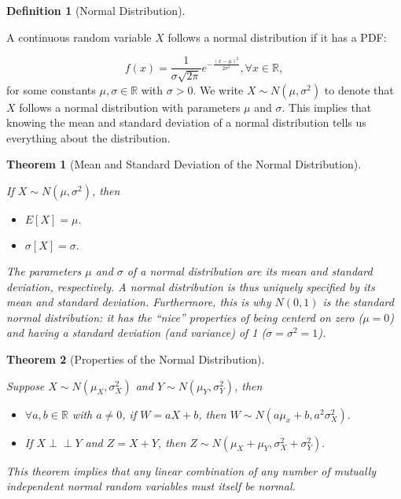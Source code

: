 \documentclass[
]{article}
\providecommand{\tightlist}{%
  \setlength{\itemsep}{0pt}\setlength{\parskip}{0pt}}
\newtheorem{theorem}{Theorem}[section]
\theoremstyle{definition}
\newtheorem{definition}{Definition}[section]
\theoremstyle{definition}
\theoremstyle{definition}
\theoremstyle{remark}
\begin{document}
\begin{definition}[Normal Distribution]
\protect\hypertarget{def:unlabeled-div-73}{}\label{def:unlabeled-div-73}

A continuous random variable \(X\) follows a normal distribution if it has a PDF:

\[f(x) = \frac{1}{\sigma\sqrt{2\pi}} e^{-\frac{(x - \mu)^2}{2\sigma^2}}, \forall x \in \mathbb{R},\]
for some constants \(\mu, \sigma \in \mathbb{R}\) with \(\sigma > 0\). We write \(X \sim N(\mu, \sigma^2)\) to denote that \(X\) follows a normal distribution with parameters \(\mu\) and \(\sigma\). This implies that knowing the mean and standard deviation of a normal distribution tells us everything about the distribution.

\end{definition}

\begin{theorem}[Mean and Standard Deviation of the Normal Distribution]
\protect\hypertarget{thm:unlabeled-div-74}{}\label{thm:unlabeled-div-74}

If \(X \sim N(\mu, \sigma^2)\), then

\begin{itemize}
\tightlist
\item
  \(E[X] = \mu.\)
\item
  \(\sigma[X] = \sigma.\)
\end{itemize}

The parameters \(\mu\) and \(\sigma\) of a normal distribution are its mean and standard deviation, respectively. A normal distribution is thus uniquely specified by its mean and standard deviation. Furthermore, this is why \(N(0,1)\) is the \emph{standard normal distribution}: it has the ``nice'' properties of being centerd on zero (\(\mu = 0\)) and having a standard deviation (and variance) of 1 (\(\sigma = \sigma^2 = 1\)).

\end{theorem}

\begin{theorem}[Properties of the Normal Distribution]
\protect\hypertarget{thm:unlabeled-div-75}{}\label{thm:unlabeled-div-75}

Suppose \(X \sim N(\mu_X, \sigma_X^2)\) and \(Y \sim N(\mu_Y, \sigma_Y^2)\), then

\begin{itemize}
\tightlist
\item
  \(\forall a,b \in \mathbb{R}\) with \(a \neq 0\), if \(W = aX + b\), then \(W \sim N(a\mu_x + b, a^2 \sigma_X^2).\)
\item
  If \(X \perp \!\!\! \perp Y\) and \(Z = X + Y\), then \(Z \sim N(\mu_X + \mu_Y, \sigma_X^2 + \sigma_Y^2).\)
\end{itemize}

This theorem implies that any linear combination of any number of mutually independent normal random variables must itself be normal.

\end{theorem}
\end{document}
